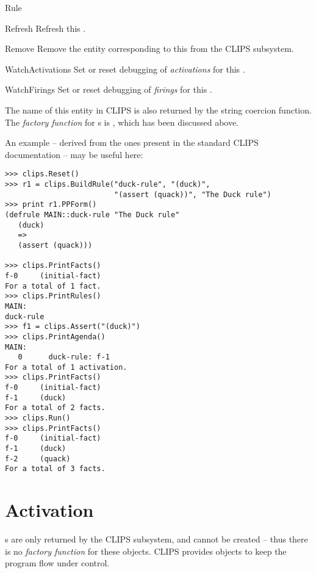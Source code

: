 \begin{classdesc*}{Rule}
\begin{methoddesc}{Refresh}{}
Refresh this .
\end{methoddesc}

\begin{methoddesc}{Remove}{}
Remove the entity corresponding to this  from the CLIPS
subsystem.
\end{methoddesc}

\begin{memberdesc}[property]{WatchActivations}
Set or reset debugging of \emph{activations} for this .
\end{memberdesc}

\begin{memberdesc}[property]{WatchFirings}
Set or reset debugging of \emph{firings} for this .
\end{memberdesc}

The name of this entity in CLIPS is also returned by the string coercion
function. The \emph{factory function} for s is
, which has been discussed above.

\end{classdesc*}

An example -- derived from the ones present in the standard CLIPS
documentation -- may be useful here:

\begin{verbatim}
>>> clips.Reset()
>>> r1 = clips.BuildRule("duck-rule", "(duck)",
                         "(assert (quack))", "The Duck rule")
>>> print r1.PPForm()
(defrule MAIN::duck-rule "The Duck rule"
   (duck)
   =>
   (assert (quack)))

>>> clips.PrintFacts()
f-0     (initial-fact)
For a total of 1 fact.
>>> clips.PrintRules()
MAIN:
duck-rule
>>> f1 = clips.Assert("(duck)")
>>> clips.PrintAgenda()
MAIN:
   0      duck-rule: f-1
For a total of 1 activation.
>>> clips.PrintFacts()
f-0     (initial-fact)
f-1     (duck)
For a total of 2 facts.
>>> clips.Run()
>>> clips.PrintFacts()
f-0     (initial-fact)
f-1     (duck)
f-2     (quack)
For a total of 3 facts.
\end{verbatim}



\section{Activation\label{pyclips-cl-Activation}}

 s are only returned by the CLIPS
subsystem, and cannot be created -- thus there is no \emph{factory
function} for these objects. CLIPS provides  objects
to keep the program flow under control.

